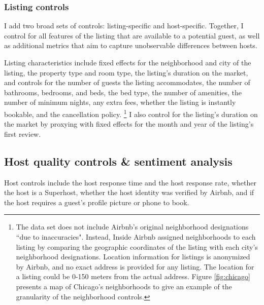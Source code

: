 \subsubsection*{Listing controls} 



I add two broad sets of controls: listing-specific and host-specific. Together, I control for all features of the listing that are available to a potential guest, as well as additional metrics that aim to capture unobservable differences between hosts. 

Listing characteristics include fixed effects for the neighborhood and city of the listing, the property type and room type, the listing's duration on the market, and controls for the number of guests the listing accommodates, the number of bathrooms, bedrooms, and beds, the bed type, the number of amenities, the number of minimum nights, any extra fees, whether the listing is instantly bookable, and the cancellation policy.%
	\footnote{The data set does not include Airbnb's original neighborhood designations ``due to inaccuracies". Instead, Inside Airbnb assigned neighborhoods to each listing by comparing the geographic coordinates of the listing with each city's neighborhood designations. Location information for listings is anonymized by Airbnb, and no exact address is provided for any listing. The location for a listing could be 0-150 meters from the actual address. Figure \ref{fig:chicago} presents a map of Chicago's neighborhoods to give an example of the granularity of the neighborhood controls.}
I also control for the listing's duration on the market by proxying with fixed effects for the month and year of the listing's first review.


\subsection*{Host quality controls  \& sentiment analysis}
Host controls include the host response time and the host response rate, whether the host is a Superhost, whether the host identity was verified by Airbnb, and if the host requires a guest's profile picture or phone to book. 

